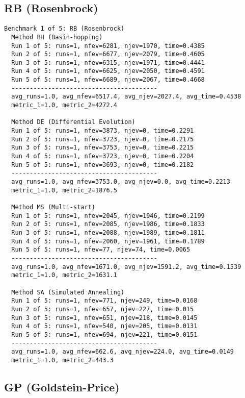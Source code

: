 \subsection{RB (Rosenbrock)}

\footnotesize
\begin{verbatim}
Benchmark 1 of 5: RB (Rosenbrock)
  Method BH (Basin-hopping)
  Run 1 of 5: runs=1, nfev=6281, njev=1970, time=0.4385
  Run 2 of 5: runs=1, nfev=6677, njev=2079, time=0.4605
  Run 3 of 5: runs=1, nfev=6315, njev=1971, time=0.4441
  Run 4 of 5: runs=1, nfev=6625, njev=2050, time=0.4591
  Run 5 of 5: runs=1, nfev=6689, njev=2067, time=0.4668
  ----------------------------------------
  avg_runs=1.0, avg_nfev=6517.4, avg_njev=2027.4, avg_time=0.4538
  metric_1=1.0, metric_2=4272.4

  Method DE (Differential Evolution)
  Run 1 of 5: runs=1, nfev=3873, njev=0, time=0.2291
  Run 2 of 5: runs=1, nfev=3723, njev=0, time=0.2175
  Run 3 of 5: runs=1, nfev=3753, njev=0, time=0.2215
  Run 4 of 5: runs=1, nfev=3723, njev=0, time=0.2204
  Run 5 of 5: runs=1, nfev=3693, njev=0, time=0.2182
  ----------------------------------------
  avg_runs=1.0, avg_nfev=3753.0, avg_njev=0.0, avg_time=0.2213
  metric_1=1.0, metric_2=1876.5

  Method MS (Multi-start)
  Run 1 of 5: runs=1, nfev=2045, njev=1946, time=0.2199
  Run 2 of 5: runs=1, nfev=2085, njev=1986, time=0.1833
  Run 3 of 5: runs=1, nfev=2088, njev=1989, time=0.1811
  Run 4 of 5: runs=1, nfev=2060, njev=1961, time=0.1789
  Run 5 of 5: runs=1, nfev=77, njev=74, time=0.0065
  ----------------------------------------
  avg_runs=1.0, avg_nfev=1671.0, avg_njev=1591.2, avg_time=0.1539
  metric_1=1.0, metric_2=1631.1

  Method SA (Simulated Annealing)
  Run 1 of 5: runs=1, nfev=771, njev=249, time=0.0168
  Run 2 of 5: runs=1, nfev=657, njev=227, time=0.015
  Run 3 of 5: runs=1, nfev=651, njev=218, time=0.0145
  Run 4 of 5: runs=1, nfev=540, njev=205, time=0.0131
  Run 5 of 5: runs=1, nfev=694, njev=221, time=0.0151
  ----------------------------------------
  avg_runs=1.0, avg_nfev=662.6, avg_njev=224.0, avg_time=0.0149
  metric_1=1.0, metric_2=443.3

\end{verbatim}

\subsection{GP (Goldstein-Price)}

